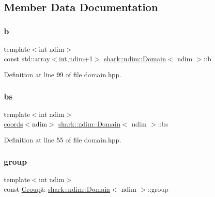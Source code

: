 \subsection{Member Data Documentation}
\hypertarget{classshark_1_1ndim_1_1_domain_a3b9ed7ea09cc2d90575a43f92cc4e105}{}\label{classshark_1_1ndim_1_1_domain_a3b9ed7ea09cc2d90575a43f92cc4e105} 
\subsubsection{\texorpdfstring{b}{b}}
{\footnotesize\ttfamily template$<$int ndim$>$ \\
const std\+::array$<$int,ndim+1$>$ \hyperlink{classshark_1_1ndim_1_1_domain}{shark\+::ndim\+::\+Domain}$<$ ndim $>$\+::b\hspace{0.3cm}{\ttfamily [private]}}



Definition at line 99 of file domain.\+hpp.

\hypertarget{classshark_1_1ndim_1_1_domain_a2be17b3d153f7fbbede6eec0afd17ebe}{}\label{classshark_1_1ndim_1_1_domain_a2be17b3d153f7fbbede6eec0afd17ebe} 
\subsubsection{\texorpdfstring{bs}{bs}}
{\footnotesize\ttfamily template$<$int ndim$>$ \\
\hyperlink{structshark_1_1ndim_1_1coords}{coords}$<$ndim$>$ \hyperlink{classshark_1_1ndim_1_1_domain}{shark\+::ndim\+::\+Domain}$<$ ndim $>$\+::bs}



Definition at line 55 of file domain.\+hpp.

\hypertarget{classshark_1_1ndim_1_1_domain_a2bbf100371762ce405efd218bc1e3d0f}{}\label{classshark_1_1ndim_1_1_domain_a2bbf100371762ce405efd218bc1e3d0f} 
\subsubsection{\texorpdfstring{group}{group}}
{\footnotesize\ttfamily template$<$int ndim$>$ \\
const \hyperlink{classshark_1_1_group}{Group}\& \hyperlink{classshark_1_1ndim_1_1_domain}{shark\+::ndim\+::\+Domain}$<$ ndim $>$\+::group}

